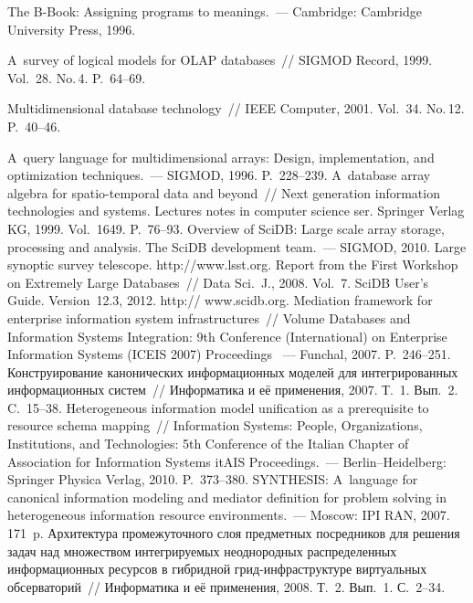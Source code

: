 \begin{multicols}{2}
{{\begin{thebibliography}{99}
 The B-Book: Assigning programs to 
meanings.~--- Cambridge: Cambridge University Press, 1996. 

 A~survey of logical models for OLAP databases~// SIGMOD 
Record, 1999. Vol.~28. No.\,4. P.~64--69. 

 Multidimensional database technology~// IEEE Computer, 
2001. Vol.~34. No.\,12. P.~40--46. 

 A~query language for multidimensional arrays: Design, 
implementation, and optimization techniques.~--- SIGMOD, 1996. P.~228--239. 
 A~database array algebra for spatio-temporal data and beyond~// Next 
generation information technologies and systems. Lectures notes in computer science ser.
Springer Verlag KG, 1999. Vol.~1649. P.~76--93.
Overview of SciDB: Large scale array storage, processing and analysis. The SciDB development 
team.~--- SIGMOD, 2010. 
Large synoptic survey telescope. {\sf http://www.lsst.org}. 
 Report from the First Workshop on Extremely Large Databases~// Data 
Sci.~J., 2008. Vol.~7.
SciDB User's Guide. Version~12.3, 2012. {\sf http:// www.scidb.org}.
Mediation framework for enterprise information system infrastructures~// Volume Databases and 
Information Systems Integration: 9th Conference (International) on Enterprise Information 
Systems (ICEIS 2007) Proceedings ~--- Funchal, 2007. P.~246--251.
 Конструирование 
канонических информационных моделей для интегрированных информационных 
сис\-тем~// Информатика и её применения, 2007. Т.~1. Вып.~2. C.~15--38. 
 Heterogeneous information model unification as a 
prerequisite to resource schema mapping~// Information Systems: People, Organizations, 
Institutions, and Technologies: 5th Conference of the Italian Chapter of Association for 
Information Systems itAIS Proceedings.~--- Berlin--Heidelberg: Springer Physica Verlag, 2010. 
P.~373--380. 
 SYNTHESIS: A~language for 
canonical information modeling and mediator definition for problem solving in heterogeneous 
information resource environments.~--- Moscow: IPI RAN, 2007. 171~p. 
 Архитектура промежуточного слоя 
предметных посредников для решения \mbox{задач} над множеством интегрируемых 
неоднородных распределенных информационных ресурсов в гиб\-рид\-ной 
грид-ин\-фра\-струк\-ту\-ре виртуальных обсерваторий~// Информатика и её применения, 
2008. Т.~2. Вып.~1. С.~2--34. 


\end{thebibliography}}}
\end{multicols}
